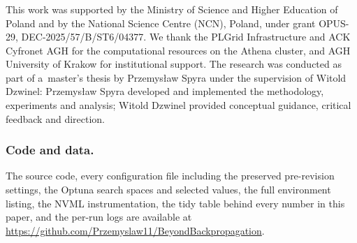 \documentclass{llncs}
\begin{document}
\subsubsection{\ackname}
This work was supported by the Ministry of Science and Higher Education of
Poland and by the National Science Centre (NCN), Poland, under grant OPUS-29,
DEC-2025/57/B/ST6/04377. We thank the PLGrid Infrastructure and ACK Cyfronet
AGH for the computational resources on the Athena cluster, and AGH University
of Krakow for institutional support. The research was conducted as part of
a~master's thesis by \mbox{Przemys{\l}aw} Spyra under the supervision of
Witold Dzwinel: \mbox{Przemys{\l}aw} Spyra developed and implemented the
methodology, experiments and analysis; Witold Dzwinel provided conceptual
guidance, critical feedback and direction.

\subsubsection{Code and data.}
\label{sec:repository}
The source code, every configuration file including the preserved
pre-revision settings, the Optuna search spaces and selected values, the full
environment listing, the NVML instrumentation, the tidy table behind every
number in this paper, and the per-run logs are available at
\url{https://github.com/Przemyslaw11/BeyondBackpropagation}.


\begin{sloppypar}

\end{sloppypar}
\end{document}
